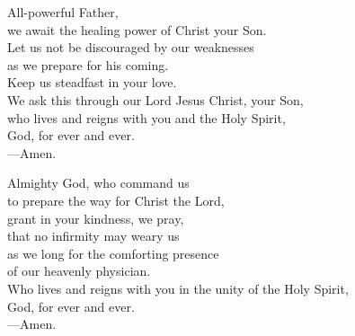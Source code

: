\prayer


\begin{prayerverse}
All-powerful Father,\\
we await the healing power of Christ your Son.\\
Let us not be discouraged by our weaknesses\\
as we prepare for his coming.\\
Keep us steadfast in your love.\\
We ask this through our Lord Jesus Christ, your Son,\\
who lives and reigns with you and the Holy Spirit,\\
God, for ever and ever.\\
{\color{red}---\thinspace}Amen.
\end{prayerverse}


\begin{prayerverse}
Almighty God, who command us\\
to prepare the way for Christ the Lord,\\
grant in your kindness, we pray,\\
that no infirmity may weary us\\
as we long for the comforting presence\\
of our heavenly physician.\\
Who lives and reigns with you in the unity of the Holy Spirit,\\
God, for ever and ever.\\
{\color{red}---\thinspace}Amen.
\end{prayerverse}


